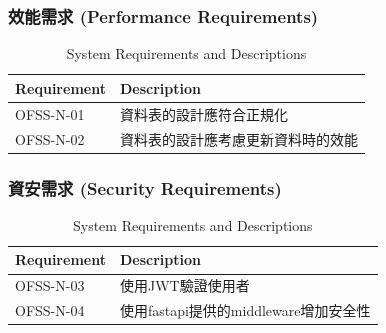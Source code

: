 \documentclass[a4paper, 12pt]{article}
\begin{document}
\subsubsection{效能需求 (Performance Requirements)}
\begin{table}[h]
    \centering
    \renewcommand{\arraystretch}{1.35}
    \begin{tabular}{|p{3cm}|p{10cm}|}
        \hline
        \textbf{Requirement} & \textbf{Description} \\
        \hline
        OFSS-N-01 & 資料表的設計應符合正規化\\
        \hline
        OFSS-N-02 & 資料表的設計應考慮更新資料時的效能 \\
        \hline
        
    \end{tabular}
    \caption{System Requirements and Descriptions}
    \label{tab:system-requirements}
\end{table}


\subsubsection{資安需求 (Security Requirements)}
\begin{table}[h]
    \centering
    \renewcommand{\arraystretch}{1.35}
    \begin{tabular}{|p{3cm}|p{10cm}|}
        \hline
        \textbf{Requirement} & \textbf{Description} \\
        \hline
        OFSS-N-03 & 使用JWT驗證使用者 \\
        \hline
        OFSS-N-04 & 使用fastapi提供的middleware增加安全性\\
        \hline
    \end{tabular}
    \caption{System Requirements and Descriptions}
    \label{tab:system-requirements}
\end{table}
\end{document}
